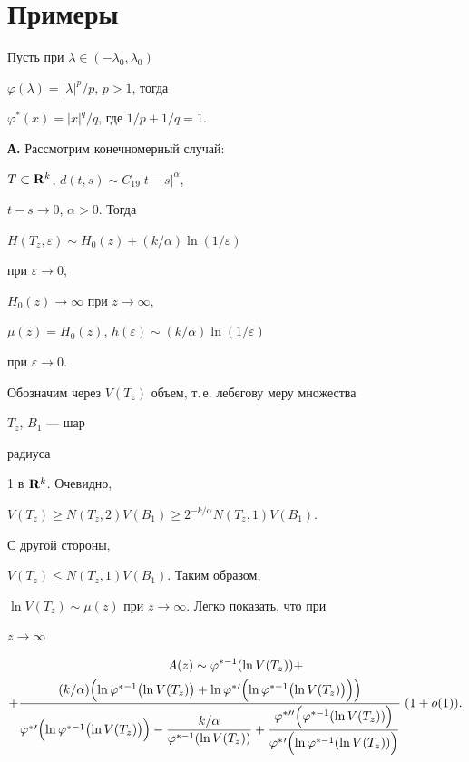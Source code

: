  


\section{Примеры} 


 


Пусть при $\lambda\in(-\lambda_0,\lambda_0)\;$ 


$\varphi(\lambda)=|\lambda|^p/p$, $p>1$, тогда 


$\varphi^*(x)=|x|^q/q$, где $1/p+1/q=1$. 


 


{\bf А.} Рассмотрим конечномерный случай: 


$T\subset{\bold R}^k$, $d(t,s)\sim C_{19}|t-s|^\alpha$, 


$t-s\to 0$, $\alpha>0$. Тогда 


$H(T_z,\varepsilon)\sim H_0(z)+(k/\alpha)\ln(1/\varepsilon)$ 


при $\varepsilon\to 0$, 


$H_0(z)\to\infty$ при $z\to\infty$, 


$\mu(z)=H_0(z)$, $h(\varepsilon)\sim(k/\alpha)\ln(1/\varepsilon)$ 


при $\varepsilon\to 0$. 


 


Обозначим через $V(T_z)$ объем, т.\,е. лебегову меру множества 


$T_z$, $B_1$ --- шар 


радиуса 


1 в ${\bold R}^k$. Очевидно, 


$V(T_z)\ge N(T_z,2)V(B_1)\ge 2^{-k/\alpha}N(T_z,1)V(B_1)$. 


С другой стороны, 


$V(T_z)\le N(T_z,1)V(B_1)$. Таким образом, 


$\ln V(T_z)\sim\mu(z)$ при $z\to\infty$. Легко показать, что при 


$z\to\infty$ 


\begin{multline*} 


A(z)\sim \varphi^{*-1}(\ln V(T_z))+\\ 


+\frac{(k/\alpha)\Bigl(\ln \varphi^{*-1}\bigl(\ln V(T_z)\bigr) 


+\ln\varphi^*{}'\Bigl(\ln\varphi^{*-1}\bigl(\ln V(T_z)\bigr)\Bigr)\Bigr)} 


{\varphi^*{}'\Bigl(\ln\varphi^{*-1}\bigl(\ln V(T_z)\bigr)\Bigr)- 


\dfrac{k/\alpha}{\varphi^{*-1}(\ln V(T_z))}+ 


\dfrac{\varphi^*{}''\Bigl(\varphi^{*-1}(\ln V(T_z))\Bigr)} 


{\varphi^*{}'\Bigl(\ln\varphi^{*-1}(\ln V(T_z))\Bigr)} 


} 


\;(1+o(1)). 


\end{multline*} 


